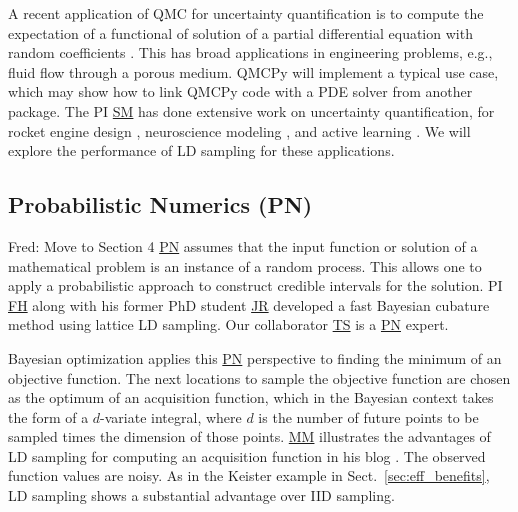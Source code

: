 \documentclass[11pt]{NSFamsart}
\newcommand{\FH}{\hyperlink{FHlink}{FH}\xspace}
\newcommand{\SM}{\hyperlink{SMlink}{SM}\xspace}
\newcommand{\MM}{\hyperlink{MMlink}{MM}\xspace}
\newcommand{\TS}{\hyperlink{TSlink}{TS}\xspace}
\newcommand{\JR}{\hyperlink{JRlink}{JR}\xspace}
\newcommand{\PN}{\hyperlink{PNlink}{PN}\xspace}
\newcommand{\FJHNote}[1]{{\color{blue}Fred: #1}}
\begin{document}
A recent application of QMC for uncertainty quantification is to compute the expectation of a functional of solution of a partial differential equation with random coefficients \cite{HerSch20a}. This has broad applications in engineering problems, e.g., fluid flow through a porous medium. QMCPy will implement a typical use case, which may show how to link QMCPy code with a PDE solver from another package. The PI \SM has done extensive work on uncertainty quantification, for rocket engine design \cite{li2017two,li2018uncertainty,chang2019kernel,yeh2018common,mak2018efficient}, neuroscience modeling \cite{wang2020uncertainty}, and active learning \cite{mak2018maximum}. We will explore the performance of LD sampling for these applications.
\fi

\subsection{Probabilistic Numerics (PN)}\hypertarget{PNlink}{} \FJHNote{Move to Section 4}
\PN assumes that the input function or solution of a mathematical problem is an instance of a random process.  This allows one to apply a probabilistic approach to construct credible intervals for the solution. PI \FH along with his former PhD student \JR developed a fast Bayesian cubature method \cite{RatHic19a} using lattice LD sampling.  Our collaborator \TS is a \PN expert.

Bayesian optimization applies this \PN perspective to finding the minimum of an objective function.  The next locations to sample the objective function are chosen as the optimum of an acquisition function, which in the Bayesian context takes the form of a $d$-variate integral, where $d$ is the number of future points to be sampled times the dimension of those points.  \MM illustrates the advantages of LD sampling for computing an acquisition function in his blog \cite[qEI with QMCPy]{QMCBlog}.  The observed function values are noisy.  As in the Keister example in Sect.\ \ref{sec:eff_benefits}, LD sampling shows a substantial advantage over IID sampling.
\end{document}
